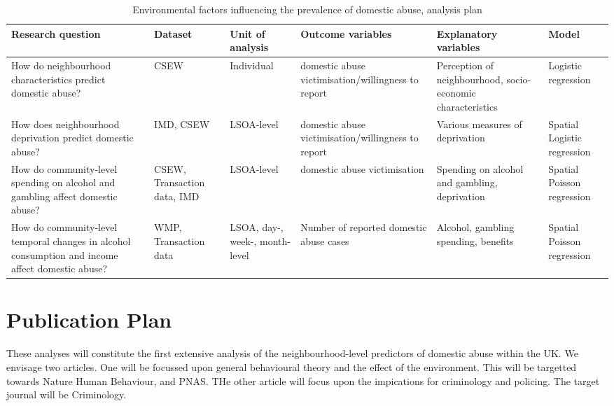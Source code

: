 \documentclass[11pt, a4paper]{article}
\begin{document}
\begin{table}[!htbp]
\caption{Environmental factors influencing the prevalence of domestic abuse, analysis plan}
  \begin{threeparttable}[t]
  \centering
       \begin{tabular}{ L{4cm}  C{1.2cm}  C{1.6cm}  C{3cm}  C{2.8cm}  C{1.8cm} }
    \toprule
     \textbf{Research question} & \textbf{Dataset}    & \textbf{Unit of analysis} & \textbf{Outcome variables} & \textbf{Explanatory variables} & \textbf{Model} \\
    \midrule
    How do neighbourhood characteristics predict domestic abuse? & CSEW & Individual & domestic abuse victimisation/willingness to report & Perception of neighbourhood, socio-economic characteristics & Logistic regression \\
         \midrule
          How does neighbourhood deprivation predict domestic abuse? & IMD, CSEW & LSOA-level & domestic abuse victimisation/willingness to report & Various measures of deprivation & Spatial Logistic regression \\
         \midrule
          How do community-level spending on alcohol and gambling affect domestic abuse? & CSEW, Transaction data, IMD & LSOA-level & domestic abuse victimisation & Spending on alcohol and gambling, deprivation & Spatial Poisson regression \\
         \midrule
    How do community-level temporal changes in alcohol consumption and income affect domestic abuse? & WMP, Transaction data & LSOA, day-, week-, month-level & Number of reported domestic abuse cases & Alcohol, gambling spending, benefits & Spatial Poisson regression \\

     \bottomrule
  \end{tabular}
    \end{threeparttable}%
  \label{tab:addlabel}%
\end{table}%

\section{Publication Plan}

These analyses will constitute the first extensive analysis of the neighbourhood-level predictors of domestic abuse within the UK. We envisage two articles. One will be focussed upon general behavioural theory and the effect of the environment. This will be targetted towards Nature Human Behaviour, and PNAS. THe other article will focus upon the impications for criminology and policing. The target journal will be Criminology. 
\end{document}
